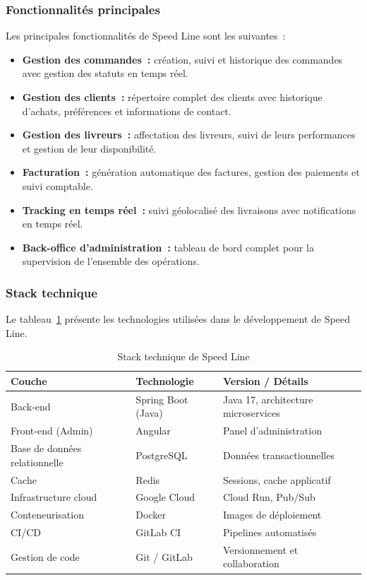 \subsubsection{Fonctionnalités principales}

Les principales fonctionnalités de Speed Line sont les suivantes~:

\begin{itemize}
    \item \textbf{Gestion des commandes~:} création, suivi et historique des commandes avec gestion des statuts en temps réel.
    \item \textbf{Gestion des clients~:} répertoire complet des clients avec historique d'achats, préférences et informations de contact.
    \item \textbf{Gestion des livreurs~:} affectation des livreurs, suivi de leurs performances et gestion de leur disponibilité.
    \item \textbf{Facturation~:} génération automatique des factures, gestion des paiements et suivi comptable.
    \item \textbf{Tracking en temps réel~:} suivi géolocalisé des livraisons avec notifications en temps réel.
    \item \textbf{Back-office d'administration~:} tableau de bord complet pour la supervision de l'ensemble des opérations.
\end{itemize}

\subsubsection{Stack technique}

Le tableau~\ref{tab:stack-technique-speedline} présente les technologies utilisées dans le développement de Speed Line.

\begin{table}[H]
\centering
\caption{Stack technique de Speed Line}
\label{tab:stack-technique-speedline}
\begin{tabular}{|l|l|l|}
\hline
\rowcolor{gray!20}
\textbf{Couche} & \textbf{Technologie} & \textbf{Version / Détails} \\
\hline
Back-end & Spring Boot (Java) & Java 17, architecture microservices \\
\hline
Front-end (Admin) & Angular & Panel d'administration \\
\hline
Base de données relationnelle & PostgreSQL & Données transactionnelles \\
\hline
Cache & Redis & Sessions, cache applicatif \\
\hline
Infrastructure cloud & Google Cloud & Cloud Run, Pub/Sub \\
\hline
Conteneurisation & Docker & Images de déploiement \\
\hline
CI/CD & GitLab CI & Pipelines automatisés \\
\hline
Gestion de code & Git / GitLab & Versionnement et collaboration \\
\hline
\end{tabular}
\end{table}

